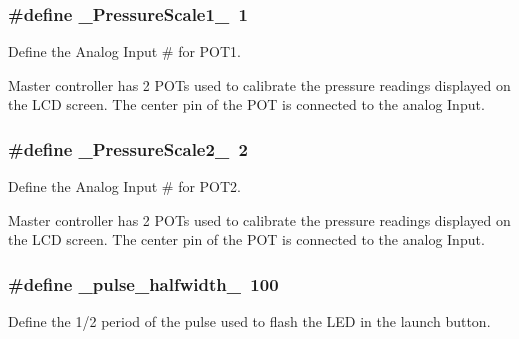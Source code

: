 \subsubsection[{\texorpdfstring{\+\_\+\+Pressure\+Scale1\+\_\+}{\_PressureScale1\_}}]{\setlength{\rightskip}{0pt plus 5cm}\#define \+\_\+\+Pressure\+Scale1\+\_\+~1}\hypertarget{masterPanel_8ino_a088d470fd122b482dc087029b21f1f75}{}\label{masterPanel_8ino_a088d470fd122b482dc087029b21f1f75}


Define the Analog Input \# for P\+O\+T1. 

Master controller has 2 P\+O\+Ts used to calibrate the pressure readings displayed on the L\+CD screen. The center pin of the P\+OT is connected to the analog Input. 
\subsubsection[{\texorpdfstring{\+\_\+\+Pressure\+Scale2\+\_\+}{\_PressureScale2\_}}]{\setlength{\rightskip}{0pt plus 5cm}\#define \+\_\+\+Pressure\+Scale2\+\_\+~2}\hypertarget{masterPanel_8ino_acef1a33ec0ad5ae6ca07e04f9d64fd2f}{}\label{masterPanel_8ino_acef1a33ec0ad5ae6ca07e04f9d64fd2f}


Define the Analog Input \# for P\+O\+T2. 

Master controller has 2 P\+O\+Ts used to calibrate the pressure readings displayed on the L\+CD screen. The center pin of the P\+OT is connected to the analog Input. 
\subsubsection[{\texorpdfstring{\+\_\+pulse\+\_\+halfwidth\+\_\+}{\_pulse\_halfwidth\_}}]{\setlength{\rightskip}{0pt plus 5cm}\#define \+\_\+pulse\+\_\+halfwidth\+\_\+~100}\hypertarget{masterPanel_8ino_a9a8dc8e6e75e845a90d783b02b6be855}{}\label{masterPanel_8ino_a9a8dc8e6e75e845a90d783b02b6be855}


Define the 1/2 period of the pulse used to flash the L\+ED in the launch button. 


